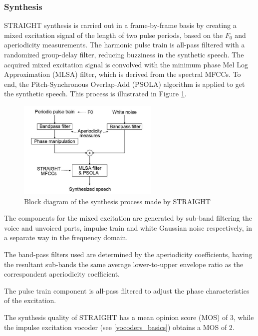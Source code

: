 \subsubsection{Synthesis}
\label{vocoders_straight_synthesis}
STRAIGHT synthesis is carried out in a frame-by-frame basis by creating a mixed excitation signal of the length of two pulse periods, based on the $F_{0}$ and aperiodicity measurements.
%
The harmonic pulse train is all-pass filtered with a randomized group-delay filter, reducing buzziness in the synthetic speech.
%
The acquired mixed excitation signal is convolved with the minimum phase Mel Log Approximation (MLSA) filter, which is derived from the spectral MFCCs.
%
To end, the Pitch-Synchronous Overlap-Add (PSOLA) algorithm \cite{moulines1990pitch} is applied to get the synthetic speech.
%
This process is illustrated in Figure \ref{fig:straight_synthesis}.

\begin{figure}[!htb]
\begin{centering}
\includegraphics[width=0.6\textwidth]{images/straight_synthesis.jpg}
\caption{Block diagram of the synthesis process made by STRAIGHT \cite{manuMSc}}
\label{fig:straight_synthesis}
\end{centering}
\end{figure}

The components for the mixed excitation are generated by sub-band filtering the voice and unvoiced parts, impulse train and white Gaussian noise respectively, in a separate way in the frequency domain.

The band-pass filters used are determined by the aperiodicity coefficients, having the resultant sub-bands the same average lower-to-upper envelope ratio as the correspondent aperiodicity coefficient.

The pulse train component is all-pass filtered to adjust the phase characteristics of the excitation.

The synthesis quality of STRAIGHT has a mean opinion score (MOS) of 3, while the impulse excitation vocoder (see \ref{vocoders_basics}) obtains a MOS of 2.